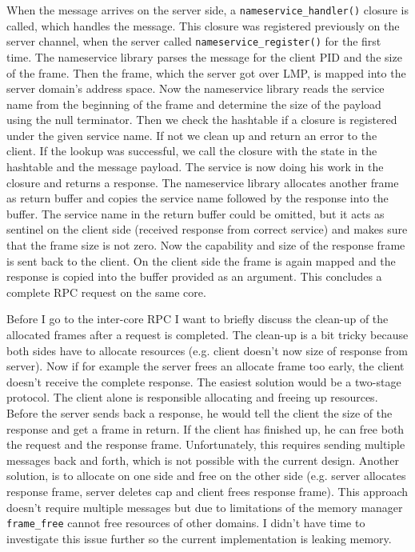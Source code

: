 When the message arrives on the server side, a \verb|nameservice_handler()| closure is called, which handles the message. This closure was
registered previously on the server channel, when the server called \verb|nameservice_register()| for the first time. The nameservice library
parses the message for the client PID and the size of the frame. Then the frame, which the server got over LMP, is mapped into the server 
domain's address space. Now the nameservice library reads the service name from the beginning of the frame and determine the size of the 
payload using the null terminator. Then we check the hashtable if a closure is registered under the given service name. If not we clean up
and return an error to the client. If the lookup was successful, we call the closure with the state in the hashtable and the message payload.
The service is now doing his work in the closure and returns a response. The nameservice library allocates another frame as return buffer and
copies the service name followed by the response into the buffer. The service name in the return buffer could be omitted, but it acts as
sentinel on the client side (received response from correct service) and makes sure that the frame size is not zero. Now the capability and
size of the response frame is sent back to the client. On the client side the frame is again mapped and the response is copied into the buffer
provided as an argument. This concludes a complete RPC request on the same core.

Before I go to the inter-core RPC I want to briefly discuss the clean-up of the allocated frames after a request is completed. The clean-up
is a bit tricky because both sides have to allocate resources (e.g. client doesn't now size of response from server). Now if for example the
server frees an allocate frame too early, the client doesn't receive the complete response. The easiest solution would be a two-stage protocol.
The client alone is responsible allocating and freeing up resources. Before the server sends back a response, he would tell the client the
size of the response and get a frame in return. If the client has finished up, he can free both the request and the response frame.
Unfortunately, this requires sending multiple messages back and forth, which is not possible with the current design. Another solution, is to
allocate on one side and free on the other side (e.g. server allocates response frame, server deletes cap and client frees response frame).
This approach doesn't require multiple messages but due to limitations of the memory manager \verb|frame_free| cannot free resources
of other domains. I didn't have time to investigate this issue further so the current implementation is leaking memory.

